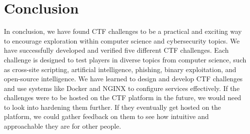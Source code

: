 \section{Conclusion}\label{sec:conclusion}

In conclusion, we have found CTF challenges to be a practical and exciting way to encourage exploration within computer science and cybersecurity topics. We have successfully developed and verified five different CTF challenges. Each challenge is designed to test players in diverse topics from computer science, such as cross-site scripting, artificial intelligence, phishing, binary exploitation, and open-source intelligence. We have learned to design and develop CTF challenges and use systems like Docker and NGINX to configure services effectively.
If the challenges were to be hosted on the CTF platform in the future, we would need to look into hardening them further. If they eventually get hosted on the platform, we could gather feedback on them to see how intuitive and approachable they are for other people.
